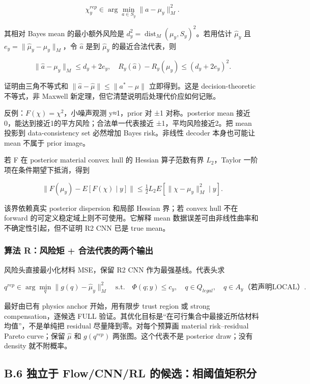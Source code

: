 \documentclass[
  11pt,
  a4paper,
]{article}
\begin{document}
\[
\chi_y^{rep}\in\arg\min_{a\in S_y}\|a-\mu_y\|_M^2.
\]

其相对 Bayes mean 的最小额外风险是
\(d_y^2=\operatorname{dist}_M(\mu_y,S_y)^2\)。若用估计 \(\hat\mu_y\) 且
\(e_y=\|\hat\mu_y-\mu_y\|_M\)，令 \(\hat a\) 是到 \(\hat\mu_y\)
的最近合法代表，则

\[
\|\hat a-\mu_y\|_M\le d_y+2e_y,
\quad R_y(\hat a)-R_y(\mu_y)\le(d_y+2e_y)^2.
\]

证明由三角不等式和 \(\|\hat a-\hat\mu\|\le\|a^*-\hat\mu\|\)
立即得到。这是 decision-theoretic 不等式，非 Maxwell
新定理，但它清楚说明后处理代价应如何记账。

反例：\(F(\chi)=\chi^2\)，小噪声观测 y≈1，prior 对 ±1 对称。posterior
mean 接近0，能达到接近1的平方风险；合法单一代表接近
±1，平均风险接近2。把 mean 投影到 data-consistency set 必然增加 Bayes
risk。非线性 decoder 本身也可能让 mean 不属于 prior image。

若 F 在 posterior material convex hull 的 Hessian 算子范数有界
\(L_2\)，Taylor 一阶项在条件期望下抵消，得到

\[
\|F(\mu_y)-E[F(\chi)\mid y]\|\le\tfrac12L_2E[\|\chi-\mu_y\|_M^2\mid y].
\]

该界依赖真实 posterior dispersion 和局部 Hessian 界；若 convex hull 不在
forward 的可定义稳定域上则不可使用。它解释 mean
数据误差可由非线性曲率和不确定性引起，但不证明 R2 CNN 已是 true mean。

\hypertarget{ux7b97ux6cd5-rux98ceux9669ux77e9-ux5408ux6cd5ux4ee3ux8868ux7684ux4e24ux4e2aux8f93ux51fa}{%
\subsubsection{算法 R：风险矩 +
合法代表的两个输出}\label{ux7b97ux6cd5-rux98ceux9669ux77e9-ux5408ux6cd5ux4ee3ux8868ux7684ux4e24ux4e2aux8f93ux51fa}}

风险头直接最小化材料 MSE，保留 R2 CNN 作为最强基线。代表头求

\[
q^{rep}\in\arg\min_q\|g(q)-\hat\mu_y\|_M^2\quad\text{s.t.}\quad\Phi(q;y)\le c_y,\quad q\in Q_{legal},\quad q\in A_y\text{（若声明LOCAL）}.
\]

最好由已有 physics anchor 开始，用有限步 trust region 或 strong
compensation，逐候选 FULL
验证。其优化目标是``在可行集合中最接近所估材料均值''，不是单纯把
residual 尽量降到零。对每个预算画 material risk--residual Pareto
curve；保留 \(\hat\mu\) 和 \(g(q^{rep})\) 两张图。这个代表不是 posterior
draw；没有 density 就不附概率。

\hypertarget{b.6-ux72ecux7acbux4e8e-flowcnnrl-ux7684ux5019ux9009ux76f8ux9608ux503cux77e9ux79efux5206}{%
\subsection{B.6 独立于 Flow/CNN/RL
的候选：相阈值矩积分}\label{b.6-ux72ecux7acbux4e8e-flowcnnrl-ux7684ux5019ux9009ux76f8ux9608ux503cux77e9ux79efux5206}}
\end{document}
